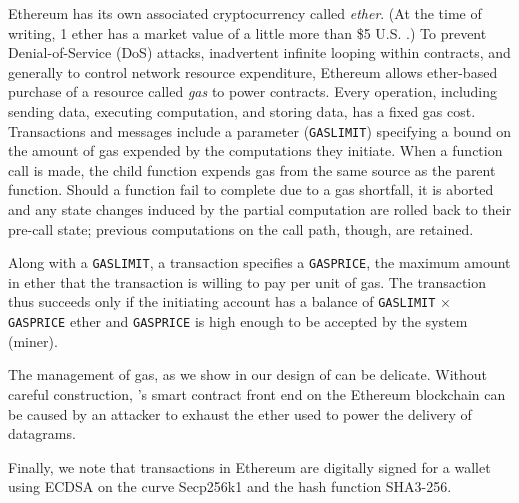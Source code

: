 Ethereum has its own associated cryptocurrency called \emph{ether}. (At the time of writing, 1 ether has a market value of a little more than \$5 U.S. \cite{http://coinmarketcap.com/currencies/ethereum}.)  To prevent Denial-of-Service (DoS) attacks, inadvertent infinite looping within contracts, and generally to control network resource expenditure,
Ethereum allows ether-based purchase of a resource called \emph{gas} to power contracts.
Every operation, including sending data, executing computation, and storing data, has a fixed gas cost.
Transactions and messages include a parameter (\texttt{GASLIMIT}) specifying a bound on the amount of gas expended by the computations they initiate.
When a function call is made, the child function expends gas from the same source as the parent function.
Should a function fail to complete due to a gas shortfall,
it is aborted and any state changes induced by the partial computation are rolled back to their pre-call state;
previous computations on the call path, though, are retained.

Along with a \texttt{GASLIMIT}, a transaction specifies a \texttt{GASPRICE}, the maximum amount in ether that the transaction is willing to pay per unit of gas. The transaction thus succeeds only if the initiating account has a balance of \texttt{GASLIMIT} $\times$ \texttt{GASPRICE} ether and \texttt{GASPRICE} is high enough to be accepted by the system (miner). 

The management of gas, as we show in our design of \tcs can be delicate. Without careful construction, \tc's smart contract front end on the Ethereum blockchain can be caused by an attacker to exhaust the ether used to power the delivery of datagrams.

Finally, we note that transactions in Ethereum are digitally signed for a wallet using ECDSA on the curve Secp256k1 and the hash function SHA3-256.



